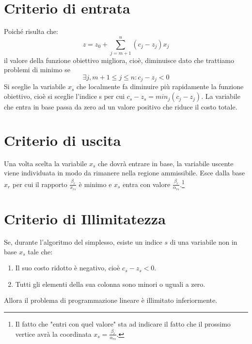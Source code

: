 \section{Criterio di entrata}
Poiché risulta che:
\[z=z_0+\sum_{j=m+1}^n(c_j-z_j)x_j\]
il valore della funzione obiettivo migliora, cioè, diminuisce dato che trattiamo problemi di minimo se 
\[\exists j, m+1\leq j\leq n:c_j-z_j<0\]
Si sceglie la variabile $x_s$ che localmente fa diminuire più rapidamente la funzione obiettivo, cioè si sceglie l'indice s per cui $c_s-z_s=min_j(c_j-z_j)$. La variabile che entra in base passa da zero ad un valore positivo che riduce il costo totale.
\section{Criterio di uscita}
Una volta scelta la variabile $x_s$ che dovrà entrare in base, la variabile uscente viene individuata in modo da rimanere nella regione ammissibile. Esce dalla base $x_r$ per cui il rapporto $\frac{\beta_r}{x_{rs}}$ è minimo e $x_s$ entra con valore $\frac{\beta_r}{\alpha_{rs}}$.\footnote{Il fatto che "entri con quel valore" sta ad indicare il fatto che il prossimo vertice avrà la coordinata $x_s=\frac{\beta_r}{\alpha_{rs}}$.}
\section{Criterio di Illimitatezza}
Se, durante l'algoritmo del simplesso, esiste un indice $s$ di una variabile non in base $x_s$ tale che:
\begin{enumerate}
    \item Il suo costo ridotto è negativo, cioè $c_s-z_s<0$.
    \item Tutti gli elementi della sua colonna sono minori o uguali a zero.
\end{enumerate}
Allora il problema di programmazione lineare è illimitato inferiormente.

